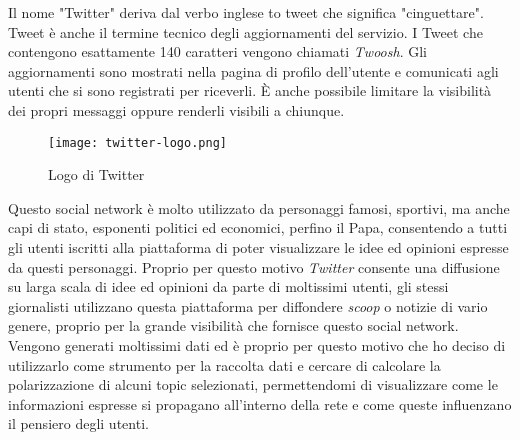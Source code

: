 Il nome "Twitter" deriva dal verbo inglese to tweet che significa "cinguettare". Tweet è anche il termine tecnico degli aggiornamenti del servizio. I Tweet che contengono esattamente 140 caratteri vengono chiamati \textit{Twoosh}. Gli aggiornamenti sono mostrati nella pagina di profilo dell'utente e comunicati agli utenti che si sono registrati per riceverli. È anche possibile limitare la visibilità dei propri messaggi oppure renderli visibili a chiunque. \begin{figure}[h!]
    \begin{center}
      \texttt{[image: twitter-logo.png]}
	\caption{Logo di Twitter}
    \end{center}
  \end{figure}

Questo social network è molto utilizzato da personaggi famosi, sportivi, ma anche capi di stato, esponenti politici ed economici, perfino il Papa, consentendo a tutti gli utenti iscritti alla piattaforma di poter visualizzare le idee ed opinioni espresse da questi personaggi. Proprio per questo motivo \textit{Twitter} consente una diffusione su larga scala di idee ed opinioni da parte di moltissimi utenti, gli stessi giornalisti utilizzano questa piattaforma per diffondere \textit{scoop} o notizie di vario genere, proprio per la grande visibilità che fornisce questo social network.
Vengono generati moltissimi dati ed è proprio per questo motivo che ho deciso di utilizzarlo come strumento per la raccolta dati e cercare di calcolare la polarizzazione di alcuni topic selezionati, permettendomi di visualizzare come le informazioni espresse si propagano all'interno della rete e come queste influenzano il pensiero degli utenti.


